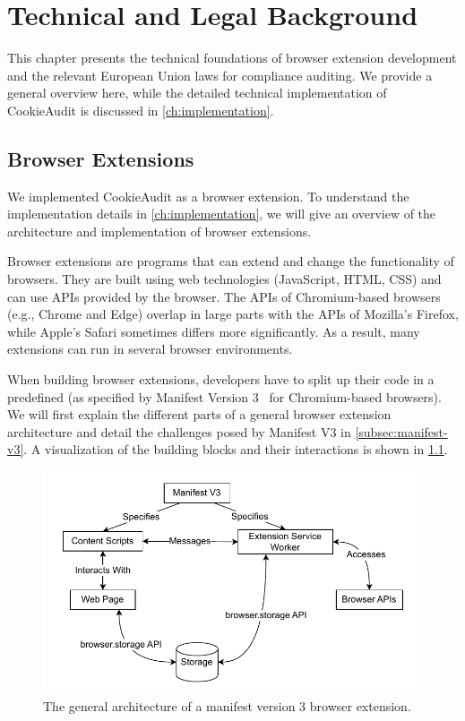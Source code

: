 \chapter{Technical and Legal Background}

This chapter presents the technical foundations of browser extension development and the relevant European Union laws for compliance auditing. We provide a general overview here, while the detailed technical implementation of CookieAudit is discussed in \cref{ch:implementation}.

\section{Browser Extensions}
We implemented CookieAudit as a browser extension.
To understand the implementation details in \cref{ch:implementation}, we will give an overview of the architecture and implementation of browser extensions.

Browser extensions are programs that can extend and change the functionality of browsers.
They are built using web technologies (JavaScript, HTML, CSS) and can use APIs provided by the browser.
The APIs of Chromium-based browsers (e.g., Chrome and Edge) overlap in large parts with the APIs of Mozilla's Firefox, while Apple's Safari sometimes differs more significantly.
As a result, many extensions can run in several browser environments.

When building browser extensions, developers have to split up their code in a predefined (as specified by Manifest Version 3~\cite{manifestv3} for Chromium-based browsers).
We will first explain the different parts of a general browser extension architecture and detail the challenges posed by Manifest V3 in \cref{subsec:manifest-v3}.
A visualization of the building blocks and their interactions is shown in \cref{fig:extension-architecture}.

\begin{figure}
	\centering
	\includegraphics[width=\textwidth]{media/browser-extension-architecture.drawio.pdf}
    \caption{The general architecture of a manifest version 3 browser extension.}
    \label{fig:extension-architecture}
\end{figure}

